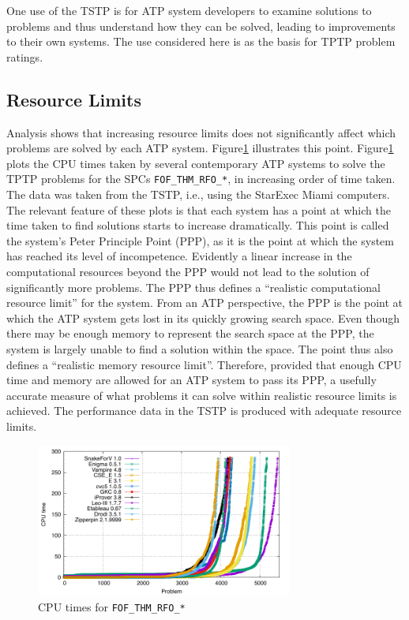 \documentclass[runningheads]{llncs}
\begin{document}
One use of the TSTP is for ATP system developers to examine solutions to problems and thus 
understand how they can be solved, leading to improvements to their own systems. 
The use considered here is as the basis for TPTP problem ratings.

\subsection{Resource Limits}
\label{ResourceLimits}

Analysis shows that increasing resource limits does not significantly affect which problems 
are solved by each ATP system. 
Figure\ref{PPPPlot} illustrates this point.
Figure\ref{PPPPlot} plots the CPU times taken by several contemporary ATP systems to solve the 
TPTP problems for the SPCs {\tt FOF\_THM\_RFO\_*}, in increasing order of time taken. 
The data was taken from the TSTP, i.e., using the StarExec Miami computers.
The relevant feature of these plots is that each system has a point at which the time taken to 
find solutions starts to increase dramatically. 
This point is called the system's Peter Principle \cite{PH69} Point (PPP), as it is the point at 
which the system has reached its level of incompetence. 
Evidently a linear increase in the computational resources beyond the PPP would not lead to the 
solution of significantly more problems. 
The PPP thus defines a ``realistic computational resource limit'' for the system. 
From an ATP perspective, the PPP is the point at which the ATP system gets lost in its quickly 
growing search space. 
Even though there may be enough memory to represent the search space at the PPP, the system is 
largely unable to find a solution within the space. 
The point thus also defines a ``realistic memory resource limit''. 
Therefore, provided that enough CPU time and memory are allowed for an ATP system to pass its 
PPP, a usefully accurate measure of what problems it can solve within realistic resource limits 
is achieved.
The performance data in the TSTP is produced with adequate resource limits.

\begin{figure}[ht!]
\centering
\includegraphics[width=0.75\textwidth]{Plots/FOF_THM_RFO_PPP/FOF_THM_RFO_PPP}
\vspace*{-1em}
\caption{CPU times for {\tt FOF\_THM\_RFO\_*}}
\label{PPPPlot}
\end{figure}
\end{document}
